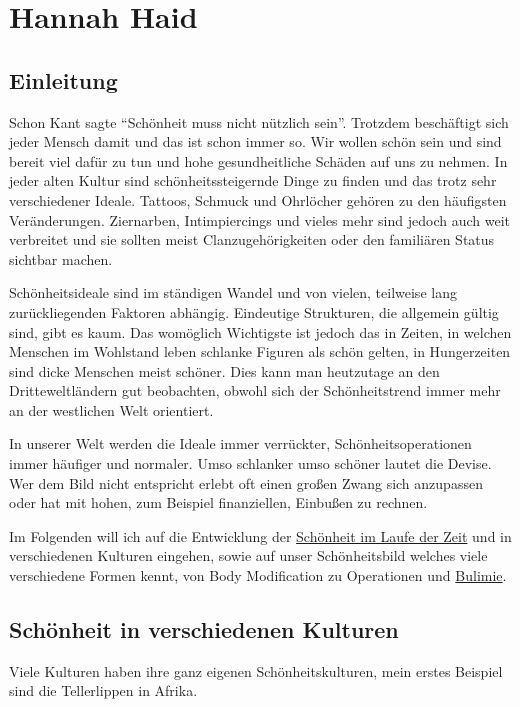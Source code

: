 \chapter{Hannah Haid}
\label{sec:Hannah_Haid}

\section{Einleitung}
Schon Kant sagte \enquote{Schönheit muss nicht nützlich sein}. Trotzdem beschäftigt sich jeder Mensch damit
und das ist schon immer so. Wir wollen schön sein und sind bereit viel dafür zu tun und hohe
gesundheitliche Schäden auf uns zu nehmen. In jeder alten Kultur sind schönheitssteigernde Dinge zu
finden und das trotz sehr verschiedener Ideale. Tattoos, Schmuck und Ohrlöcher gehören zu den
häufigsten Veränderungen. Ziernarben, Intimpiercings und vieles mehr sind jedoch auch weit
verbreitet und
sie sollten meist Clanzugehörigkeiten oder den familiären Status
sichtbar machen.

Schönheitsideale sind im ständigen Wandel und von vielen, teilweise lang zurückliegenden
Faktoren abhängig. Eindeutige Strukturen, die allgemein gültig sind, gibt es kaum. Das
womöglich
Wichtigste ist jedoch das in Zeiten, in welchen Menschen im Wohlstand leben schlanke Figuren als
schön
gelten, in Hungerzeiten sind dicke Menschen meist schöner. Dies kann man heutzutage an den
Dritteweltländern gut beobachten, obwohl sich der Schönheitstrend immer mehr an der westlichen Welt
orientiert.

In unserer Welt werden die Ideale immer verrückter, Schönheitsoperationen immer häufiger und
normaler. Umso schlanker umso schöner lautet die Devise. Wer dem Bild nicht entspricht erlebt oft
einen großen Zwang sich anzupassen oder hat mit hohen, zum Beispiel finanziellen, Einbußen zu
rechnen.

Im Folgenden will ich auf die Entwicklung der
\hyperref[sec:Hannah_Haid:beauty_over_time]{Schönheit im Laufe der Zeit}
und in verschiedenen Kulturen
eingehen, sowie auf unser Schönheitsbild welches viele verschiedene Formen kennt, von Body
Modification zu Operationen und \href{http://de.wikipedia.org/wiki/Bulimie}{Bulimie}.

\clearpage
\section{Schönheit in verschiedenen Kulturen}
Viele Kulturen haben ihre ganz eigenen Schönheitskulturen, mein erstes Beispiel sind die
Tellerlippen in Afrika.

